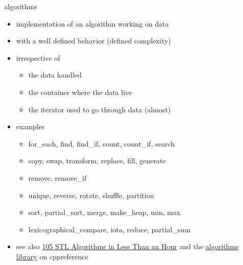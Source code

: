 \begin{frame}[fragile]
  \begin{block}{algorithms}
    \begin{itemize}
    \item implementation of an algorithm working on data
    \item with a well defined behavior (defined complexity)
    \item irrespective of
      \begin{itemize}
      \item the data handled
      \item the container where the data live
      \item the iterator used to go through data (almost)
      \end{itemize}
    \item examples
      \begin{itemize}
      \item for\_each, find, find\_if, count, count\_if, search
      \item copy, swap, transform, replace, fill, generate
      \item remove, remove\_if
      \item unique, reverse, rotate, shuffle, partition
      \item sort, partial\_sort, merge, make\_heap, min, max
      \item lexicographical\_compare, iota, reduce, partial\_sum
      \end{itemize}
    \item see also \href{https://www.youtube.com/watch?v=2olsGf6JIkU}{105 STL Algorithms in Less Than an Hour} and the \href{https://en.cppreference.com/w/cpp/algorithm}{algorithms library} on cppreference
    \end{itemize}
  \end{block}
\end{frame}

